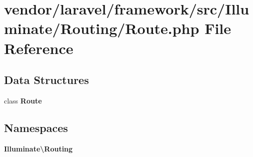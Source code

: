 \section{vendor/laravel/framework/src/\+Illuminate/\+Routing/\+Route.php File Reference}
\label{laravel_2framework_2src_2_illuminate_2_routing_2_route_8php}
\subsection*{Data Structures}
\begin{DoxyCompactItemize}
\item 
class {\bf Route}
\end{DoxyCompactItemize}
\subsection*{Namespaces}
\begin{DoxyCompactItemize}
\item 
 {\bf Illuminate\textbackslash{}\+Routing}
\end{DoxyCompactItemize}
